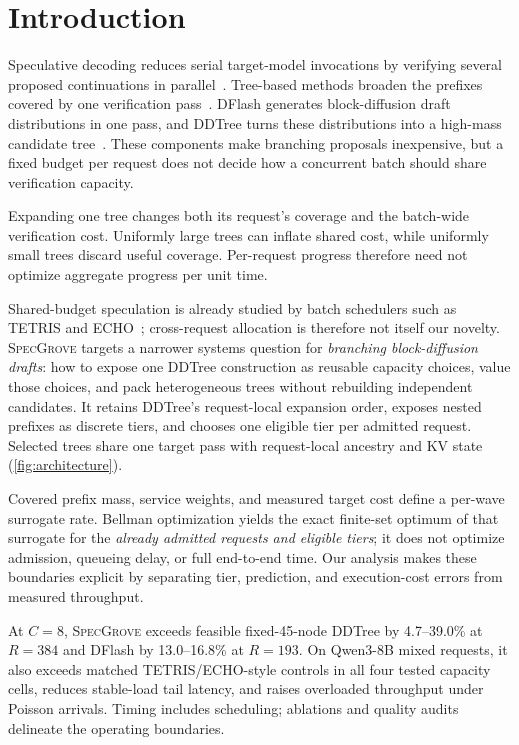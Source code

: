 \documentclass{article}
\newcommand{\method}{\textsc{SpecGrove}\xspace}
\begin{document}
\section{Introduction}
\label{sec:introduction}
Speculative decoding reduces serial target-model invocations by verifying several proposed continuations in parallel~\citep{leviathan2023fast,chen2023accelerating}. Tree-based methods broaden the prefixes covered by one verification pass~\citep{miao2024specinfer,cai2024medusa,chen2024sequoia}. DFlash generates block-diffusion draft distributions in one pass, and DDTree turns these distributions into a high-mass candidate tree~\citep{chen2026dflash,ringel2026ddtree}. These components make branching proposals inexpensive, but a fixed budget per request does not decide how a concurrent batch should share verification capacity.

Expanding one tree changes both its request's coverage and the batch-wide verification cost. Uniformly large trees can inflate shared cost, while uniformly small trees discard useful coverage. Per-request progress therefore need not optimize aggregate progress per unit time.

Shared-budget speculation is already studied by batch schedulers such as TETRIS and ECHO~\citep{wu2025tetris,hu2026echo}; cross-request allocation is therefore not itself our novelty. \method targets a narrower systems question for \emph{branching block-diffusion drafts}: how to expose one DDTree construction as reusable capacity choices, value those choices, and pack heterogeneous trees without rebuilding independent candidates. It retains DDTree's request-local expansion order, exposes nested prefixes as discrete tiers, and chooses one eligible tier per admitted request. Selected trees share one target pass with request-local ancestry and KV state (\cref{fig:architecture}).

Covered prefix mass, service weights, and measured target cost define a per-wave surrogate rate. Bellman optimization yields the exact finite-set optimum of that surrogate for the \emph{already admitted requests and eligible tiers}; it does not optimize admission, queueing delay, or full end-to-end time. Our analysis makes these boundaries explicit by separating tier, prediction, and execution-cost errors from measured throughput.

At $C=8$, \method exceeds feasible fixed-45-node DDTree by 4.7--39.0\% at $R=384$ and DFlash by 13.0--16.8\% at $R=193$. On Qwen3-8B mixed requests, it also exceeds matched TETRIS/ECHO-style controls in all four tested capacity cells, reduces stable-load tail latency, and raises overloaded throughput under Poisson arrivals. Timing includes scheduling; ablations and quality audits delineate the operating boundaries.
\end{document}
